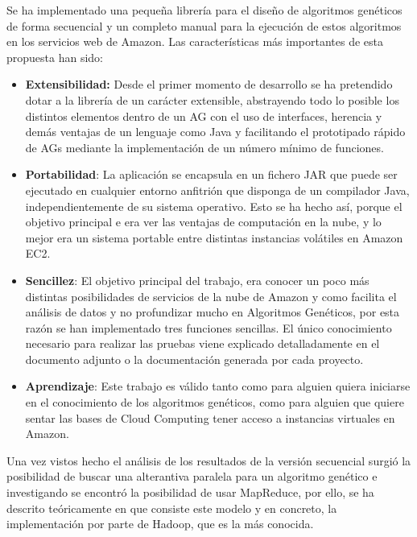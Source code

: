\documentclass[runningheads]{llncs}
\begin{document}
Se ha implementado una pequeña librería para el diseño de algoritmos genéticos de forma secuencial y un completo manual para 
la ejecución de estos algoritmos en los servicios web de Amazon.  Las características más importantes de esta propuesta han sido:

\begin{itemize}
 \item \textbf{Extensibilidad:} Desde el primer momento de desarrollo se ha pretendido dotar a la librería de un carácter extensible, 
 abstrayendo todo lo posible los distintos elementos dentro de un AG con el uso de interfaces, herencia y demás 
 ventajas de un lenguaje como Java y facilitando el prototipado rápido de AGs  mediante la implementación de un número mínimo de 
 funciones.

 \item \textbf{Portabilidad}: La aplicación se encapsula en un fichero JAR que puede ser ejecutado en cualquier entorno anfitrión que 
 disponga de un compilador Java, independientemente de su sistema operativo. Esto se ha hecho así, porque el objetivo principal e
 era ver las ventajas de computación en la nube, y lo mejor era un sistema portable entre distintas instancias volátiles en 
 Amazon EC2.

 \item \textbf{Sencillez}: El objetivo principal del trabajo, era conocer un poco más distintas posibilidades de servicios de la 
 nube de Amazon y como facilita el análisis de datos  y no profundizar mucho en Algoritmos Genéticos, por esta razón se han 
 implementado tres funciones sencillas. El único conocimiento necesario para realizar las pruebas viene explicado detalladamente 
 en el documento adjunto o la documentación generada por cada proyecto.
 
 \item \textbf{Aprendizaje}: Este trabajo es válido tanto como para alguien quiera iniciarse en el conocimiento de los algoritmos 
 genéticos, como para alguien que quiere sentar las bases de Cloud Computing tener acceso a instancias virtuales en Amazon.
 
\end{itemize}


Una vez vistos hecho el análisis de los resultados de la versión secuencial surgió la posibilidad de buscar una alterantiva  
paralela para un algoritmo genético  e investigando se encontró la posibilidad de  usar MapReduce, por ello, se ha descrito 
teóricamente en que consiste este modelo y en concreto, la implementación por parte de  Hadoop, que es la 
más conocida. 
\end{document}
